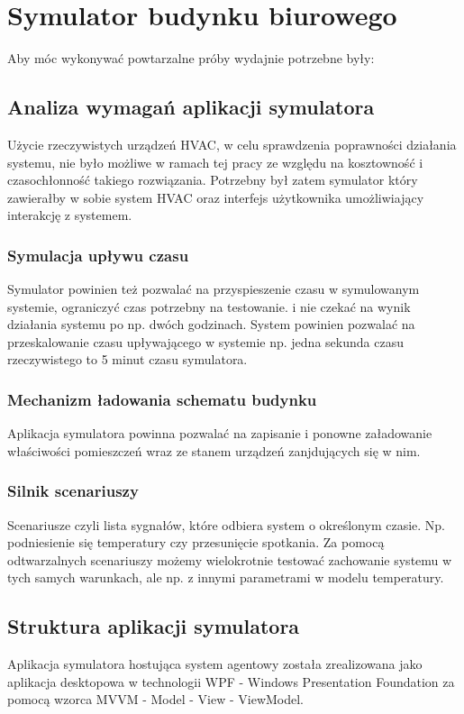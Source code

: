 \chapter{Symulator budynku biurowego}
Aby móc wykonywać powtarzalne próby wydajnie potrzebne były:

\section{Analiza wymagań aplikacji symulatora}
Użycie rzeczywistych urządzeń HVAC, w celu sprawdzenia poprawności działania systemu, nie było możliwe w ramach tej pracy ze względu na kosztowność i czasochłonność takiego rozwiązania. 
Potrzebny był zatem symulator który zawierałby w sobie system HVAC oraz interfejs użytkownika umożliwiający interakcję z systemem. 

\subsection*{Symulacja upływu czasu}
Symulator powinien też pozwalać na przyspieszenie czasu w symulowanym systemie, ograniczyć czas potrzebny na testowanie.
i nie czekać na wynik działania systemu po np. dwóch godzinach. System powinien pozwalać na przeskalowanie czasu upływającego w systemie np. jedna sekunda czasu rzeczywistego to 5 minut czasu symulatora.

\subsection*{Mechanizm ładowania schematu budynku}
Aplikacja symulatora powinna pozwalać na zapisanie i ponowne załadowanie właściwości pomieszczeń wraz ze stanem urządzeń zanjdujących się w nim.

\subsection*{Silnik scenariuszy}
Scenariusze czyli lista sygnałów, które odbiera system o określonym czasie. Np. podniesienie się temperatury czy przesunięcie spotkania. Za pomocą odtwarzalnych scenariuszy możemy wielokrotnie testować zachowanie systemu w tych samych warunkach, ale np. z innymi parametrami w modelu temperatury.

\section{Struktura aplikacji symulatora}
Aplikacja symulatora hostująca system agentowy została zrealizowana jako aplikacja desktopowa w technologii WPF - Windows Presentation Foundation za pomocą wzorca MVVM - Model - View - ViewModel.
